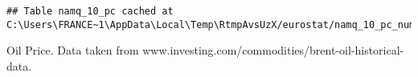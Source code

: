 \documentclass[
]{article}
\newenvironment{Shaded}{\begin{snugshade}}{\end{snugshade}}
\newcommand{\DataTypeTok}[1]{\textcolor[rgb]{0.13,0.29,0.53}{#1}}
\newcommand{\DecValTok}[1]{\textcolor[rgb]{0.00,0.00,0.81}{#1}}
\newcommand{\KeywordTok}[1]{\textcolor[rgb]{0.13,0.29,0.53}{\textbf{#1}}}
\newcommand{\NormalTok}[1]{#1}
\newcommand{\OperatorTok}[1]{\textcolor[rgb]{0.81,0.36,0.00}{\textbf{#1}}}
\newcommand{\OtherTok}[1]{\textcolor[rgb]{0.56,0.35,0.01}{#1}}
\newcommand{\StringTok}[1]{\textcolor[rgb]{0.31,0.60,0.02}{#1}}
\begin{document}
\begin{verbatim}
## Table namq_10_pc cached at C:\Users\FRANCE~1\AppData\Local\Temp\RtmpAvsUzX/eurostat/namq_10_pc_num_code_FF.rds
\end{verbatim}

\begin{Shaded}
\end{Shaded}

Oil Price. Data taken from
www.investing.com/commodities/brent-oil-historical-data.
\end{document}
